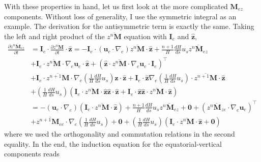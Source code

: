 With these properties in hand, let us first look at the more complicated $\mathbf{M}_{ez}$ components. Without loss of generality, I use the symmetric integral as an example. The derivation for the antisymmetric term is exactly the same. Taking the left and right product of the $\overline{z^n \mathbf{M}}$ equation with $\mathbf{I}_e$ and $\hat{\mathbf{z}}$, 
\[\begin{aligned}
    \frac{\partial \overline{z^n \mathbf{M}_{ez}}}{\partial t} &= \mathbf{I}_e\cdot \frac{\partial \overline{z^n \mathbf{M}}}{\partial t} \cdot \hat{\mathbf{z}} = - \mathbf{I}_e\cdot (\mathbf{u}_e\cdot \nabla_e) \overline{z^n \mathbf{M}}\cdot \hat{\mathbf{z}} + \frac{n+1}{H}\frac{dH}{ds} u_s \overline{z^n \mathbf{M}_{ez}} \\
    &+ \mathbf{I}_e\cdot \overline{z^n \mathbf{M}}\cdot \nabla_e \mathbf{u}_e \cdot \hat{\mathbf{z}} + \left(\hat{\mathbf{z}}\cdot \overline{z^n \mathbf{M}}\cdot \nabla_e \mathbf{u}_e\cdot \mathbf{I}_e\right)^\top \\
    &+ \mathbf{I}_e\cdot \overline{z^{n+1} \mathbf{M}}\cdot \nabla_e \left(\frac{1}{H}\frac{dH}{ds}u_s\right) \hat{\mathbf{z}}\cdot \hat{\mathbf{z}} + \mathbf{I}_e\cdot \hat{\mathbf{z}} \nabla_e \left(\frac{1}{H}\frac{dH}{ds}u_s\right) \cdot \overline{z^{n+1} \mathbf{M}}\cdot \hat{\mathbf{z}} \\
    &+ \left(\frac{1}{H}\frac{dH}{ds}u_s\right) \left(\mathbf{I}_e\cdot \overline{z^n \mathbf{M}}\cdot \hat{\mathbf{z}} \hat{\mathbf{z}}\cdot \hat{\mathbf{z}} + \mathbf{I}_e\cdot \hat{\mathbf{z}}\hat{\mathbf{z}}\cdot \overline{z^n \mathbf{M}}\cdot \hat{\mathbf{z}}\right) \\ 
    &= - (\mathbf{u}_e\cdot \nabla_e) \left(\mathbf{I}_e\cdot \overline{z^n \mathbf{M}}\cdot \hat{\mathbf{z}}\right) + \frac{n+1}{H}\frac{dH}{ds} u_s \overline{z^n \mathbf{M}_{ez}} + \mathbf{0} + \left(\overline{z^n \mathbf{M}_{ze}}\cdot \nabla_e \mathbf{u}_e\right)^\top \\ 
    &+ \overline{z^{n+1} \mathbf{M}_{ee}}\cdot \nabla_e \left(\frac{1}{H}\frac{dH}{ds}u_s\right) + \mathbf{0} + \left(\frac{1}{H}\frac{dH}{ds}u_s\right) \left(\mathbf{I}_e\cdot \overline{z^n \mathbf{M}} \cdot \hat{\mathbf{z}} + \mathbf{0}\right)
\end{aligned}\]
where we used the orthogonality and commutation relations in the second equality. In the end, the induction equation for the equatorial-vertical components reads
